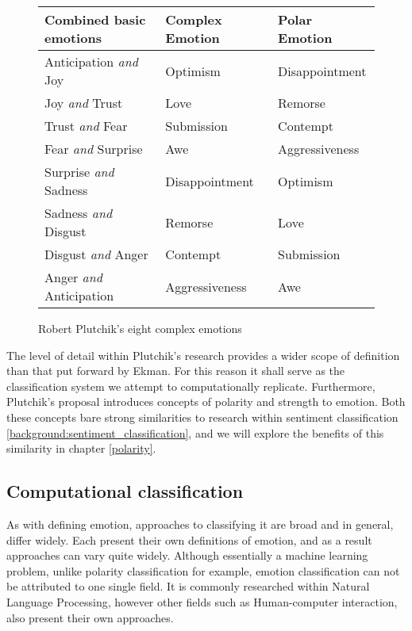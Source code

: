 \begin{figure}
	\caption{Robert Plutchik's eight complex emotions}
	\label{fig:eight-complex-emotions}
	\centering
	\begin{tabular}{ | l | l | l | }
		\hline
		Combined basic emotions & Complex Emotion & Polar Emotion \\
		\hline 
		Anticipation \emph{and} Joy & Optimism & Disappointment \\
		Joy \emph{and} Trust & Love & Remorse \\
		Trust \emph{and} Fear & Submission & Contempt \\
		Fear \emph{and} Surprise & Awe & Aggressiveness \\
		Surprise \emph{and} Sadness & Disappointment & Optimism \\
		Sadness \emph{and} Disgust & Remorse & Love \\
		Disgust \emph{and} Anger & Contempt & Submission \\
		Anger \emph{and} Anticipation & Aggressiveness & Awe \\
		\hline
	\end{tabular}
\end{figure}

The level of detail within Plutchik's research provides a wider scope of definition than that put forward by Ekman. For this reason it shall serve as the classification system we attempt to computationally replicate. Furthermore, Plutchik's proposal introduces concepts of polarity and strength to emotion. Both these concepts bare strong similarities to research within sentiment classification \ref{background:sentiment_classification}, and we will explore the benefits of this similarity in chapter \ref{polarity}.

\subsection{Computational classification}

As with defining emotion, approaches to classifying it are broad and in general, differ widely. Each present their own definitions of emotion, and as a result approaches can vary quite widely. Although essentially a machine learning problem, unlike polarity classification for example, emotion classification can not be attributed to one single field. It is commonly researched within Natural Language Processing, however other fields such as Human-computer interaction, also present their own approaches. 

